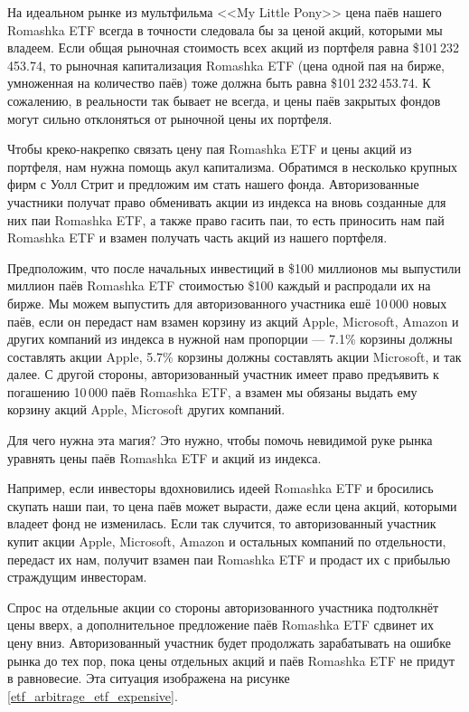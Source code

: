 На идеальном рынке из мультфильма <<My Little Pony>> цена паёв нашего Romashka ETF 
всегда в точности следовала бы за ценой акций, которыми мы владеем. Если общая рыночная стоимость всех акций из портфеля равна \$101\,232\,453.74, то рыночная капитализация Romashka ETF (цена одной пая на бирже, умноженная на количество паёв) тоже должна быть равна \$101\,232\,453.74. К сожалению, в реальности так бывает не всегда, и цены паёв закрытых фондов могут сильно отклоняться от рыночной цены их портфеля.

Чтобы креко-накрепко связать цену пая Romashka ETF и цены акций из портфеля, нам нужна помощь акул капитализма. Обратимся в несколько крупных фирм с Уолл Стрит и предложим им стать  нашего фонда. Авторизованные участники получат право обменивать акции из индекса на вновь созданные для них паи Romashka ETF, а также право гасить паи, то есть приносить нам пай Romashka ETF и взамен получать часть акций из нашего портфеля.

Предположим, что после начальных инвестиций в \$100 миллионов мы выпустили миллион паёв Romashka ETF стоимостью \$100 каждый и распродали их на бирже. Мы можем выпустить для авторизованного участника ешё 10\,000 новых паёв, если он передаст нам взамен корзину из акций Apple, Microsoft, Amazon и других компаний из индекса в нужной нам пропорции --- 7.1\% корзины должны составлять акции Apple, 5.7\% корзины должны составлять акции Microsoft, и так далее. С другой стороны, авторизованный участник имеет право предъявить к погашению 10\,000 паёв Romashka ETF, а взамен мы обязаны выдать ему корзину акций Apple, Microsoft других компаний.

Для чего нужна эта магия? Это нужно, чтобы помочь невидимой руке рынка уравнять цены паёв Romashka ETF и акций из индекса.

Например, если инвесторы вдохновились идеей Romashka ETF и бросились скупать наши паи, то цена паёв может вырасти, даже если цена акций, которыми владеет фонд не изменилась. Если так случится, то авторизованный участник купит акции Apple, Microsoft, Amazon и остальных компаний по отдельности, передаст их нам, получит взамен паи Romashka ETF и продаст их с прибылью страждущим инвесторам.

Спрос на отдельные акции со стороны авторизованного участника подтолкнёт цены вверх, а дополнительное предложение паёв Romashka ETF сдвинет их цену вниз. Авторизованный участник будет продолжать зарабатывать на ошибке рынка до тех пор, пока цены отдельных акций и паёв Romashka ETF не придут в равновесие. Эта ситуация изображена на рисунке \ref{etf_arbitrage_etf_expensive}.

